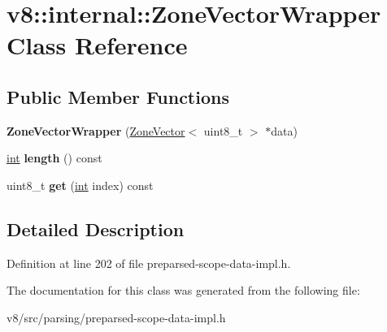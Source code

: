 \hypertarget{classv8_1_1internal_1_1ZoneVectorWrapper}{}\section{v8\+:\+:internal\+:\+:Zone\+Vector\+Wrapper Class Reference}
\label{classv8_1_1internal_1_1ZoneVectorWrapper}
\subsection*{Public Member Functions}
\begin{DoxyCompactItemize}
\item 
\mbox{\label{classv8_1_1internal_1_1ZoneVectorWrapper_aeb3f27d92df7530c3e0b5a4e27d1bcba}} 
{\bfseries Zone\+Vector\+Wrapper} (\mbox{\hyperlink{classv8_1_1internal_1_1ZoneVector}{Zone\+Vector}}$<$ uint8\+\_\+t $>$ $\ast$data)
\item 
\mbox{\label{classv8_1_1internal_1_1ZoneVectorWrapper_aa8e919bf52944fdd1347e6768cb6356c}} 
\mbox{\hyperlink{classint}{int}} {\bfseries length} () const
\item 
\mbox{\label{classv8_1_1internal_1_1ZoneVectorWrapper_a968cfe6a1513be4dc362c97bfff7182a}} 
uint8\+\_\+t {\bfseries get} (\mbox{\hyperlink{classint}{int}} index) const
\end{DoxyCompactItemize}


\subsection{Detailed Description}


Definition at line 202 of file preparsed-\/scope-\/data-\/impl.\+h.



The documentation for this class was generated from the following file\+:\begin{DoxyCompactItemize}
\item 
v8/src/parsing/preparsed-\/scope-\/data-\/impl.\+h\end{DoxyCompactItemize}
